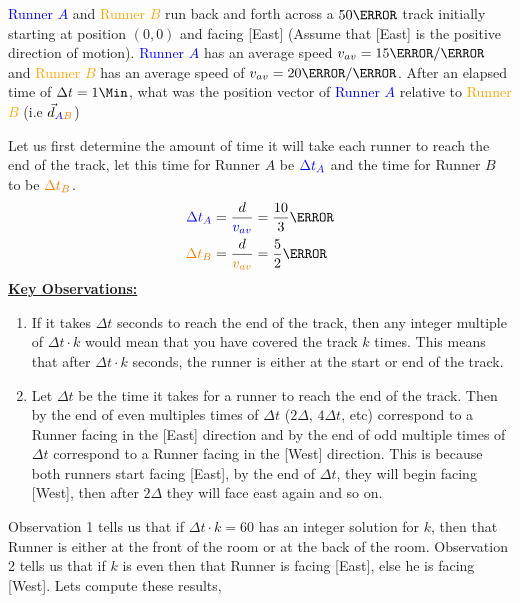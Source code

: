 \documentclass[12pt]{article} %
\begin{document}
\begin{qstn}[11]
	\textcolor{blue}{Runner $A$} and \textcolor{orange}{Runner $B$} run back and forth across a $50\m$ track initially starting at position $(0,0)$ and facing [East] (Assume that [East] is the positive direction of motion). \textcolor{blue}{Runner $A$} has an average speed \textcolor{blue}{$v_{av} = 15 \m / \s$} and \textcolor{orange}{Runner $B$} has an average speed of \textcolor{orange}{$v_{av} = 20 \m / \s$}. After an elapsed time of $\Delta t = 1\Min$, what was the position vector of \textcolor{blue}{Runner $A$} relative to \textcolor{orange}{Runner $B$} (i.e $\vec d_{\textcolor{blue}{A}\textcolor{orange}{B}}$) 


	\begin{soln}
		Let us first determine the amount of time it will take each runner to reach the end of the track, let this time for Runner $A$ be $\textcolor{blue}{\Delta t_A}$ and the time for Runner $B$ to be $\textcolor{orange}{\Delta t_B}$.
		\begin{align*}
			\textcolor{blue}{\Delta t_A }&= \frac{d}{\textcolor{blue}{v_{av}}} = \frac{10}{3}\s \\
			\textcolor{orange}{\Delta t_B} &= \frac{d}{\textcolor{orange}{v_{av}}}= \frac{5}{2} \s
		\end{align*}
	\textbf{\underline{\large{Key Observations:}}}
	\begin{enumerate}
		\item If it takes $\Delta t$ seconds to reach the end of the track, then any integer multiple of $\Delta t \cdot k$ would mean that you have covered the track $k$ times. This means that after $\Delta t \cdot k$ seconds, the runner is either at the start or end of the track.
		\item Let $\Delta t$ be the time it takes for a runner to reach the end of the track. Then by the end of even multiples times of $\Delta t$ ($2\Delta$, $4\Delta t$, etc) correspond to a Runner facing in the [East] direction and by the end of odd multiple times of $\Delta t$ correspond to a Runner facing in the [West] direction. This is because both runners start facing [East], by the end of $\Delta t$, they will begin facing [West], then after $2\Delta$ they will face east again and so on.
	\end{enumerate}
	Observation 1 tells us that if $\Delta t \cdot k = 60$ has an integer solution for $k$, then that Runner is either at the front of the room or at the back of the room. Observation 2 tells us that if $k$ is even then that Runner is facing [East], else he is facing [West]. Lets compute these results,

\end{soln}
\end{qstn}
\end{document}
